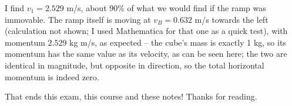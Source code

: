 \documentclass[8.01x]{subfiles}
\begin{document}
I find $v_1 = 2.529$ m/s, about 90\% of what we would find if the ramp was immovable. The ramp itself is moving at $v_B = 0.632$ m/s towards the left (calculation not shown; I used Mathematica for that one as a quick test), with momentum $2.529$ kg m/s, as expected -- the cube's mass is exactly 1 kg, so its momentum has the same value as its velocity, as can be seen here; the two are identical in magnitude, but opposite in direction, so the total horizontal momentum is indeed zero.

That ends this exam, this course and these notes! Thanks for reading.
\end{document}
